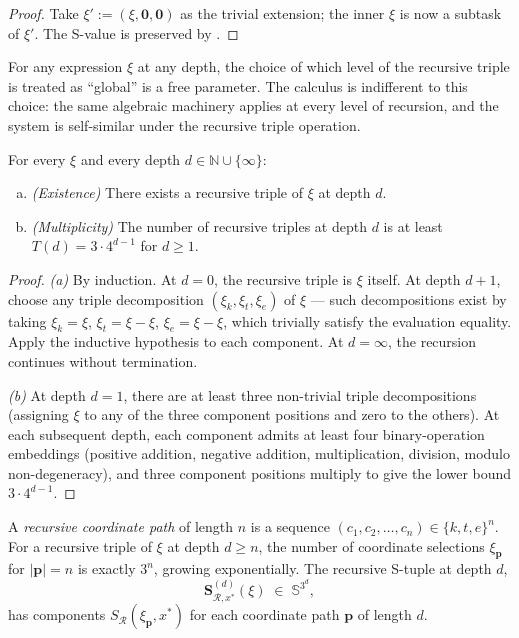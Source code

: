 \begin{proof}
Take $\xi' := (\xi, \mathbf{0}, \mathbf{0})$ as the trivial extension; the
inner $\xi$ is now a subtask of $\xi'$.  The S-value is preserved by
.
\end{proof}

\begin{corollary}
\label{cor:recursive-global}
For any expression $\xi$ at any depth, the choice of which level of the
recursive triple is treated as ``global'' is a free parameter.  The calculus
is indifferent to this choice: the same algebraic machinery applies at every
level of recursion, and the system is self-similar under the recursive triple
operation.
\end{corollary}

\begin{theorem}
\label{thm:exist-mult-rec-triple}
For every $\xi$ and every depth $d \in \mathbb{N} \cup \{\infty\}$:
\begin{enumerate}[(a)]
  \item \emph{(Existence)} There exists a recursive triple of $\xi$ at depth $d$.
  \item \emph{(Multiplicity)} The number of recursive triples at depth $d$ is
    at least $T(d) = 3 \cdot 4^{d-1}$ for $d \geq 1$.
\end{enumerate}
\end{theorem}

\begin{proof}
\emph{(a)} By induction.  At $d = 0$, the recursive triple is $\xi$ itself.
At depth $d+1$, choose any triple decomposition $(\xi_k, \xi_t, \xi_e)$
of $\xi$ — such decompositions exist by taking $\xi_k = \xi$,
$\xi_t = \xi - \xi$, $\xi_e = \xi - \xi$, which trivially satisfy the
evaluation equality.  Apply the inductive hypothesis to each component.
At $d = \infty$, the recursion continues without termination.

\emph{(b)} At depth $d = 1$, there are at least three non-trivial triple
decompositions (assigning $\xi$ to any of the three component positions and
zero to the others).  At each subsequent depth, each component admits at
least four binary-operation embeddings (positive addition, negative addition,
multiplication, division, modulo non-degeneracy), and three component
positions multiply to give the lower bound $3 \cdot 4^{d-1}$.
\end{proof}

\begin{theorem}
\label{thm:recursive-coords}
A \emph{recursive coordinate path} of length $n$ is a sequence
$(c_1, c_2, \ldots, c_n) \in \{k, t, e\}^n$.  For a recursive triple of
$\xi$ at depth $d \geq n$, the number of coordinate selections $\xi_{\mathbf{p}}$
for $|\mathbf{p}| = n$ is exactly $3^n$, growing exponentially.  The
recursive S-tuple at depth $d$,
\[
  \mathbf{S}^{(d)}_{\mathcal{R}, x^*}(\xi)
  \;\in\; \mathbb{S}^{3^d} ,
\]
has components $S_{\mathcal{R}}(\xi_{\mathbf{p}}, x^*)$ for each coordinate
path $\mathbf{p}$ of length $d$.
\end{theorem}

